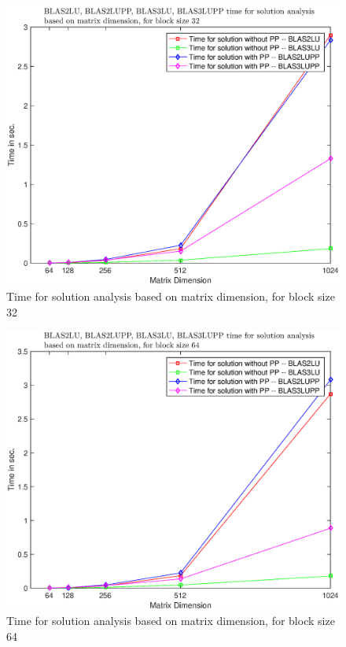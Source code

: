 \documentclass[conference,compsoc]{IEEEtran}
\begin{document}
     \begin{figure}[H]
     \centering
     \includegraphics[width=1\columnwidth]{time_32.eps}
     \caption{Time for solution analysis based on matrix dimension, for block size 32}\label{graph:time_32}
     \end{figure}


    \begin{figure}[H]
     \centering
     \includegraphics[width=1\columnwidth]{time_64.eps}
     \caption{Time for solution analysis based on matrix dimension, for block size 64}\label{graph:time_64}
     \end{figure}
  
\end{document}
